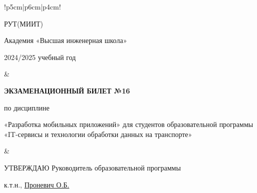 \documentclass[a4paper]{article}
\begin{document}
\newpage


\begin{tabular}{!{\vrule width 2pt}p{5cm}|p{6cm}|p{4cm}!{\vrule width 2pt}}

    {\centering 
    \fontsize{14pt}{16pt}\selectfont
    РУТ(МИИТ)

\vspace{14pt}

Академия «Высшая инженерная школа»

\vspace{14pt}

2024/2025 учебный год

    }
&
{
    \centering
\fontsize{14pt}{16pt}\selectfont

\textbf{ЭКЗАМЕНАЦИОННЫЙ
БИЛЕТ №16}


по дисциплине 

«Разработка мобильных приложений» 
\fontsize{12pt}{14pt}\selectfont
для студентов образовательной программы «IT-сервисы и технологии обработки данных на транспорте»

}
&
{
\centering
\fontsize{14pt}{16pt}\selectfont

УТВЕРЖДАЮ
Руководитель образовательной программы

\vspace{1cm}

\fontsize{12pt}{14pt}\selectfont
\underline{\hspace{3cm}}

к.т.н., \underline{Проневич О.Б.}

}
\\
\hline
{}
\end{tabular}
\end{document}
